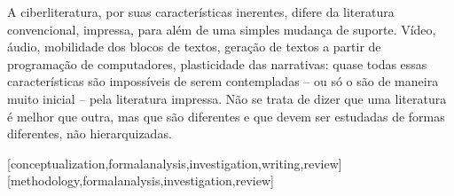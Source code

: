 \documentclass[portuguese]{textolivre}
\begin{document}
A ciberliteratura, por suas características inerentes, difere da literatura convencional, impressa, para além de uma simples mudança de suporte. Vídeo, áudio, mobilidade dos blocos de textos, geração de textos a partir de programação de computadores, plasticidade das narrativas: quase todas essas características são impossíveis de serem contempladas – ou só o são de maneira muito inicial – pela literatura impressa. Não se trata de dizer que uma literatura é melhor que outra, mas que são diferentes e que devem ser estudadas de formas diferentes, não hierarquizadas. 



\printbibliography\label{sec-bib}


\begin{contributors}
[conceptualization,formalanalysis,investigation,writing,review]
[methodology,formalanalysis,investigation,review]
\end{contributors}
\end{document}
